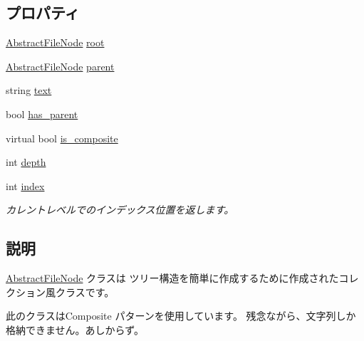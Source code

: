 \subsection*{プロパティ}
\begin{DoxyCompactItemize}
\item 
\hyperlink{classlazurite_1_1attitude_1_1_abstract_file_node}{AbstractFileNode} \hyperlink{classlazurite_1_1attitude_1_1_abstract_file_node_aef503a4b7e10d0608b7d9143a0304b42}{root}
\item 
\hyperlink{classlazurite_1_1attitude_1_1_abstract_file_node}{AbstractFileNode} \hyperlink{classlazurite_1_1attitude_1_1_abstract_file_node_a2819f5572d0a5e33cdfc4f50ee0e8d8f}{parent}
\item 
string \hyperlink{classlazurite_1_1attitude_1_1_abstract_file_node_aa117dae2818bab77b5215d6307c99aeb}{text}
\item 
bool \hyperlink{classlazurite_1_1attitude_1_1_abstract_file_node_ae05845cbaf865f736f7ab086c2917c37}{has\_\-parent}
\item 
virtual bool \hyperlink{classlazurite_1_1attitude_1_1_abstract_file_node_aa10f20180663fe19416447c3b3486061}{is\_\-composite}
\item 
int \hyperlink{classlazurite_1_1attitude_1_1_abstract_file_node_a1f0ba501fb7f35eec94d1c5efde04cc9}{depth}
\item 
int \hyperlink{classlazurite_1_1attitude_1_1_abstract_file_node_aa577939aa3338fcc7ddb7a8b916bfce3}{index}
\begin{DoxyCompactList}\small\item\em カレントレベルでのインデックス位置を返します。 \item\end{DoxyCompactList}\end{DoxyCompactItemize}


\subsection{説明}
\hyperlink{classlazurite_1_1attitude_1_1_abstract_file_node}{AbstractFileNode} クラスは ツリー構造を簡単に作成するために作成されたコレクション風クラスです。 
\begin{DoxyPre}
 此のクラスはComposite パターンを使用しています。
 残念ながら、文字列しか格納できません。あしからず。
 \end{DoxyPre}
 

